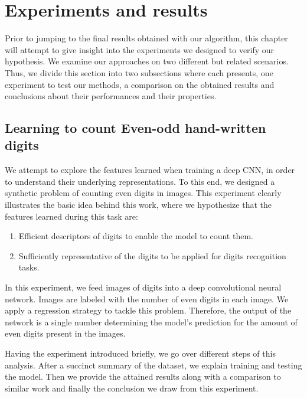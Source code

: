 \newpage
\chapter{Experiments and results}
\label{sec:experiments}

Prior to jumping to the final results obtained with our algorithm, this
chapter will attempt to give insight into the experiments we designed to verify our hypothesis. We examine our approaches on two different but related scenarios. Thus, we divide this section into two subsections where each presents, one experiment to test our methods, a comparison on the obtained results and conclusions about their performances and their properties.  

\section{Learning to count Even-odd hand-written digits}

We attempt to explore the features learned when training a deep CNN, in order to understand their underlying representations. To this end, we designed a synthetic problem of counting even digits in images. This experiment clearly illustrates the basic idea behind this work, where we hypothesize that the features learned during this task are:
\begin{enumerate}
\item Efficient descriptors of digits to enable the model to count them.
\item Sufficiently representative of the digits to be applied for digits recognition tasks. 
\end{enumerate}

In this experiment, we feed images of digits into a deep convolutional neural network. Images are labeled with the number of even digits in each image. We apply a regression strategy to tackle this problem. Therefore, the output of the network is a single number determining the model's prediction for the amount of even digits present in the images. 

\indent Having the experiment introduced briefly, we go over different steps of this analysis. After a succinct summary of the dataset, we explain training and testing the model. Then we provide the attained results along with a comparison to similar work and finally the conclusion we draw from this experiment. 

